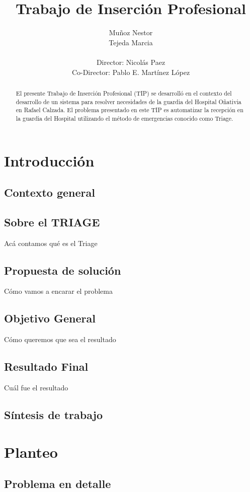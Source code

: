 \documentclass[a4paper,10pt]{article}
\title{Trabajo de Inserción Profesional}
\author{Muñoz Nestor \\ Tejeda Marcia \\ \\ Director: Nicolás Paez \\  Co-Director: Pablo E. Martínez López}
\begin{document}
\maketitle
\newpage 
\begin{abstract}
El presente Trabajo de Inserción Profesional (TIP) se desarrolló en el contexto del desarrollo de un sistema para resolver necesidades de la guardia del Hospital Oñativia en Rafael Calzada.
\linebreak 
El problema presentado en este TIP es automatizar la recepción en la guardia del Hospital utilizando el método de emergencias conocido como Triage. 

\end{abstract}


\newpage 
\tableofcontents


\newpage 
\section{Introducción}
\subsection{Contexto general}
\subsection{Sobre el TRIAGE}
Acá contamos qué es el Triage

\subsection{Propuesta de solución}
Cómo vamos a encarar el problema
\subsection{Objetivo General}
Cómo queremos que sea el resultado
\subsection{Resultado Final}
Cuál fue el resultado
\subsection{Síntesis de trabajo}

\newpage 
\section{Planteo}
\subsection{Problema en detalle}
\end{document}

